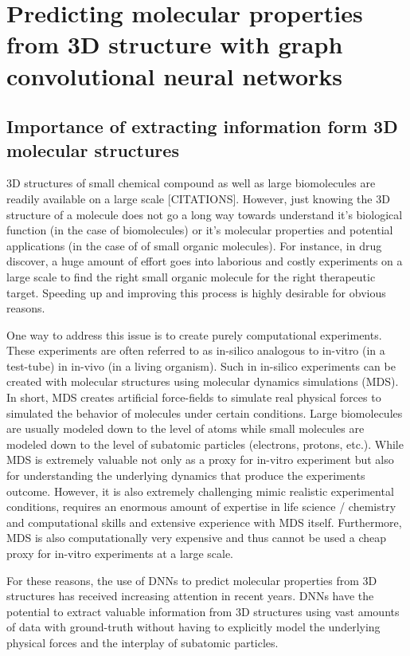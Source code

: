 \section{Predicting molecular properties from 3D structure with graph convolutional neural networks}

\subsection{Importance of extracting information form 3D molecular structures}

3D structures of small chemical compound as well as large biomolecules are readily available on a large scale [CITATIONS]. However, just knowing the 3D structure of a molecule does not go a long way towards understand it's biological function (in the case of biomolecules) or it's molecular properties and potential applications (in the case of of small organic molecules). For instance, in drug discover, a huge amount of effort goes into laborious and costly experiments on a large scale to find the right small organic molecule for the right therapeutic target. Speeding up and improving this process is highly desirable for obvious reasons.

One way to address this issue is to create purely computational experiments. These experiments are often referred to as in-silico analogous to in-vitro (in a test-tube) in in-vivo (in a living organism). Such in in-silico experiments can be created with molecular structures using molecular dynamics simulations (MDS). In short, MDS creates artificial force-fields to simulate real physical forces to simulated the behavior of molecules under certain conditions. Large biomolecules are usually modeled down to the level of atoms while small molecules are modeled down to the level of subatomic particles (electrons, protons, etc.). While MDS is extremely valuable not only as a proxy for in-vitro experiment but also for understanding the underlying dynamics that produce the experiments outcome. However, it is also extremely challenging mimic realistic experimental conditions, requires an enormous amount of expertise in life science / chemistry and computational skills and extensive experience with MDS itself. Furthermore, MDS is also computationally very expensive and thus cannot be used a cheap proxy for in-vitro experiments at a large scale.

For these reasons, the use of DNNs to predict molecular properties from 3D structures has received increasing attention in recent years. DNNs have the potential to extract valuable information from 3D structures using vast amounts of data with ground-truth without having to explicitly model the underlying physical forces and the interplay of subatomic particles.

